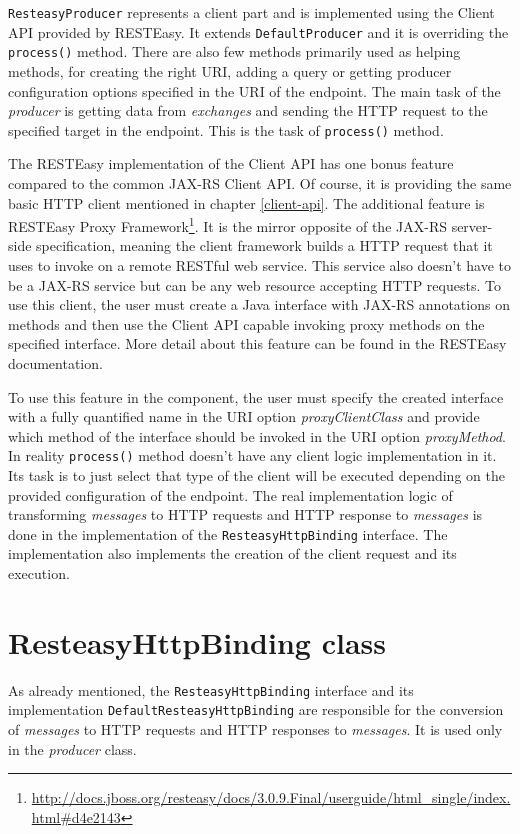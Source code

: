 \documentclass[12pt,final,oneside]{fithesis2}
\begin{document}
\texttt{ResteasyProducer} represents a client part and is implemented using the Client API provided by RESTEasy. It extends \texttt{DefaultProducer} and it is overriding the \texttt{process()} method. There are also few methods  primarily used as helping methods, for creating the right URI, adding a query or getting producer configuration options specified in the URI of the endpoint. The main task of the \textit{producer} is getting data from \textit{exchanges} and sending the HTTP request to the specified target in the endpoint. This is the task of \texttt{process()} method. 

The RESTEasy implementation of the Client API has one bonus feature compared to the common JAX-RS Client API. Of course, it is providing the same basic HTTP client mentioned in chapter \ref{client-api}. The additional feature is RESTEasy Proxy Framework\footnote{\url{http://docs.jboss.org/resteasy/docs/3.0.9.Final/userguide/html_single/index.html\#d4e2143}}. It is the mirror opposite of the JAX-RS server-side specification, meaning the client framework builds a HTTP request that it uses to invoke on a remote RESTful web service. This service also doesn't have to be a JAX-RS service but can be any web resource accepting HTTP requests. To use this client, the user must create a Java interface with JAX-RS annotations on methods and then use the Client API capable invoking proxy methods on the specified interface\cite{resteasy-doc}. More detail about this feature can be found in the RESTEasy documentation. 

To use this feature in the component, the user must specify the created interface with a fully quantified name in the URI option \textit{proxyClientClass} and provide which method of the interface should be invoked in the URI option \textit{proxyMethod}. In reality \texttt{process()} method doesn't have any client logic implementation in it. Its task is to just select that type of the client will be executed depending on the provided configuration of the endpoint. The real implementation logic of transforming \textit{messages} to HTTP requests and HTTP response to \textit{messages} is done in the implementation of the \texttt{ResteasyHttpBinding} interface. The implementation also implements the creation of the client request and its execution.




\section{ResteasyHttpBinding class}
As already mentioned, the \texttt{ResteasyHttpBinding} interface and its implementation \texttt{DefaultResteasyHttpBinding} are responsible for the conversion of \textit{messages} to HTTP requests and HTTP responses to \textit{messages}. It is used only in the \textit{producer} class. 
\end{document}
